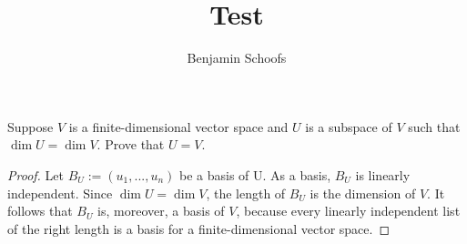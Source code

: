 \documentclass{article}
\title{Test}
\author{Benjamin Schoofs}
\begin{document}
	\maketitle
	
	\begin{exercise}[12345]
		Suppose \(V\) is a finite-dimensional vector space and \(U\) is a subspace of \(V\) such that \(\dim U = \dim V\). Prove that \(U = V\).
	\end{exercise}
	
	\begin{proof}
		Let \(B_U := (u_1, ..., u_n)\) be a basis of U. As a basis, \(B_U\) is linearly independent. Since \(\dim U = \dim V\), the length of \(B_U\) is the dimension of \(V\). It follows that \(B_U\) is, moreover, a basis of \(V\), because every linearly independent list of the right length is a basis for a finite-dimensional vector space.  
	\end{proof}

	
		
\end{document}
